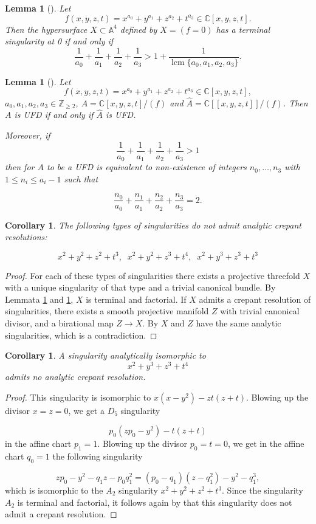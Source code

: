 \documentclass[a4paper]{amsart}
\theoremstyle{plain}
\newtheorem{Lem}[Thm]{Lemma}
\newtheorem{Cor}[Thm]{Corollary}
\theoremstyle{definition}
\theoremstyle{remark}
\numberwithin{equation}{section}
\begin{document}
\begin{Lem}[\mbox{\cite[Thm.~2]{Lin}}]
	\label{lem:Lin2}
		Let \[
f(x,y,z,t) = x^{a_{0}}+y^{a_{1}}+z^{a_{2}}+t^{a_{3}}\in\mathbb C[x,y,z,t].
\] Then the hypersurface $X\subset\mathbb A^{4}$ defined by $X=(f=0)$ has a terminal singularity at 0 if and only if
	\[
\frac1{a_{0}} +\frac1{a_{1}}+\frac1{a_{2}}+\frac1{a_{3}}>1+\frac1{\operatorname{lcm}\{a_{0},a_{1}, a_{2}, a_{3}\}}.
\]

\end{Lem}
\begin{Lem}[\mbox{\cite[Thm.~B]{Lin}}]\label{lem:LinB}
	Let \[
f(x,y,z,t) = x^{a_{0}}+y^{a_{1}}+z^{a_{2}}+t^{a_{3}}\in\mathbb C[x,y,z,t],
\] $a_{0},a_{1}, a_{2}, a_{3}\in\mathbb Z_{\ge2}$, $A=\mathbb C[x,y,z,t]/(f)$ and $\hat A=\mathbb C[[x,y,z,t]]/(f)$. Then $A$ is UFD if and only if $\hat A$ is UFD.

	Moreover, if \[
\frac1{a_{0}} +\frac1{a_{1}}+\frac1{a_{2}}+\frac1{a_{3}}>1
\] then for $A$ to be a UFD is equivalent to non-existence of integers $n_{0},\dots,n_{3}$ with $1\le n_{i}\le a_{i}-1$ such that

\[
\frac{n_{0}}{a_{0}} + \frac{n_{1}}{a_{1}} + \frac{n_{2}}{a_{2}} + \frac{n_{3}}{a_{3}}=2.
\]
\end{Lem}
\begin{Cor}\label{cor:Lin}
	The following types of singularities do not admit analytic crepant resolutions:

	$$
	x^{2}+y^{2}+z^{2}+t^{3},\;\; x^{2}+y^{2}+z^{3}+t^{4},\;\; x^{2}+y^{3}+z^{3}+t^{3}
	$$
\end{Cor}
\begin{proof}
	For each of these types of singularities there exists a projective threefold $X$ with a unique singularity of that type and a trivial canonical bundle. By Lemmata \ref{lem:Lin2} and \ref{lem:LinB}, $X$ is terminal and factorial. If $X$ admits a crepant resolution of singularities, there exists a smooth projective manifold $Z$ with trivial canonical divisor, and a birational map
	$Z\longrightarrow X$.
	By \cite[Cor, 4.11]{Kollar} $X$ and $Z$ have the same analytic singularities, which is a contradiction.
\end{proof}
\begin{Cor}\label{cor:2334}
	A singularity analytically isomorphic to
	$$
	x^{2}+y^{3}+z^{3}+t^{4}
	$$
	admits no analytic crepant resolution.
\end{Cor}
\begin{proof}
	This singularity is isomorphic to $x(x-y^{2}) - zt(z+t)$. Blowing up the divisor $x=z=0$, we get a $D_{5}$ singularity

	$$
	p_{0}(zp_{0}-y^{2}) - t(z+t)
	$$
	in the affine chart $p_{1}=1$.
	Blowing up the divisor $p_{0}=t=0$, we get in the affine chart $q_{0}=1$ the following singularity

	$$
	zp_{0}-y^{2}-q_{1}z-p_{0}q_{1}^{2} = (p_{0}-q_{1})(z-q_{1}^{2}) -y^{2} - q_{1}^{3},
	$$
	which is isomorphic to the $A_{2}$ singularity $x^{2}+y^{2}+z^{2}+t^{3}$.
	Since the singularity $A_{2}$ is terminal and factorial, it follows again by \cite[Cor, 4,11]{Kollar} that this singularity does not admit a crepant resolution.
\end{proof}
\end{document}
